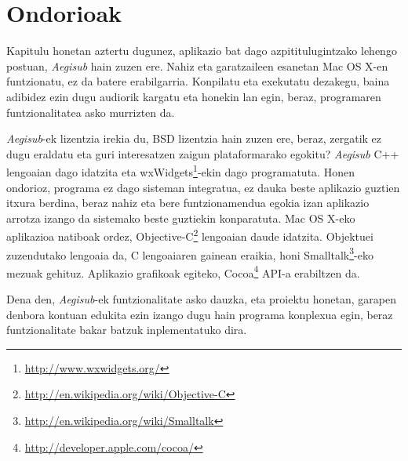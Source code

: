 \section{Ondorioak}

Kapitulu honetan aztertu dugunez, aplikazio bat dago azpititulugintzako lehengo postuan, \textit{Aegisub} hain zuzen ere. Nahiz eta garatzaileen esanetan Mac OS X-en funtzionatu, ez da batere erabilgarria. Konpilatu eta exekutatu dezakegu, baina adibidez ezin dugu audiorik kargatu eta honekin lan egin, beraz, programaren funtzionalitatea asko murrizten da.

\textit{Aegisub}-ek lizentzia irekia du, BSD lizentzia hain zuzen ere, beraz, zergatik ez dugu eraldatu eta guri interesatzen zaigun plataformarako egokitu? \textit{Aegisub} C++ lengoaian dago idatzita eta wxWidgets\footnote{\url{http://www.wxwidgets.org/}}-ekin dago programatuta. Honen ondorioz, programa ez dago sisteman integratua, ez dauka beste aplikazio guztien itxura berdina, beraz nahiz eta bere funtzionamendua egokia izan aplikazio arrotza izango da sistemako beste guztiekin konparatuta. Mac OS X-eko aplikazioa natiboak ordez, Objective-C\footnote{\url{http://en.wikipedia.org/wiki/Objective-C}} lengoaian daude idatzita. Objektuei zuzendutako lengoaia da, C lengoaiaren gainean eraikia, honi Smalltalk\footnote{\url{http://en.wikipedia.org/wiki/Smalltalk}}-eko mezuak gehituz. Aplikazio grafikoak egiteko, Cocoa\footnote{\url{http://developer.apple.com/cocoa/}} API-a erabiltzen da.

Dena den, \textit{Aegisub}-ek funtzionalitate asko dauzka, eta proiektu honetan, garapen denbora kontuan edukita ezin izango dugu hain programa konplexua egin, beraz funtzionalitate bakar batzuk inplementatuko dira.

